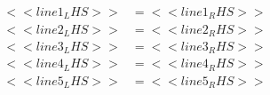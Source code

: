 \begin{varwidth}{0.25\paperwidth}
    \begin{align*}
    <<line1_LHS>> &= <<line1_RHS>>\\
    <<line2_LHS>> &= <<line2_RHS>>\\
    <<line3_LHS>> &= <<line3_RHS>>\\
    <<line4_LHS>> &= <<line4_RHS>>\\
    <<line5_LHS>> &= <<line5_RHS>>\\
\end{align*}
\end{varwidth}

